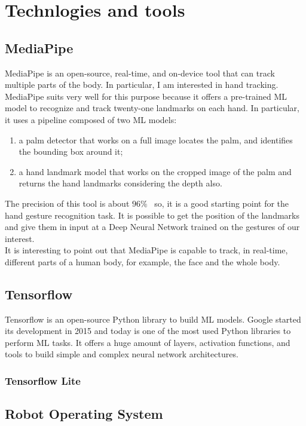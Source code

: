 \documentclass[../thesis.tex]{subfiles}
\begin{document}
\chapter{Technlogies and tools}\label{cap:technologies-and-tools}

\section{MediaPipe}\label{sec:mediapipe}
MediaPipe is an open-source, real-time, and on-device tool that can track multiple parts of the body. In particular, I am interested in hand tracking. MediaPipe suits very well for this purpose because it offers a pre-trained \acrshort{ML} model to recognize and track twenty-one landmarks on each hand. In particular, it uses a pipeline composed of two \acrshort{ML} models:
\begin{enumerate}
    \item a palm detector that works on a full image locates the palm, and identifies the bounding box around it;
    \item a hand landmark model that works on the cropped image of the palm and returns the hand landmarks considering the depth also. 
\end{enumerate}
The precision of this tool is about $96\%$~\cite{article:mediapipe} so, it is a good starting point for the hand gesture recognition task. It is possible to get the position of the landmarks and give them in input at a Deep Neural Network trained on the gestures of our interest.\\
It is interesting to point out that MediaPipe is capable to track, in real-time, different parts of a human body, for example, the face and the whole body.~\cite{site:mediapipe}

\section{Tensorflow}
Tensorflow is an open-source Python library to build \acrshort{ML} models. Google started its development in 2015 and today is one of the most used Python libraries to perform \acrshort{ML} tasks. It offers a huge amount of layers, activation functions, and tools to build simple and complex neural network architectures.

\subsection{Tensorflow Lite}

\section{Robot Operating System}
 
\end{document}
